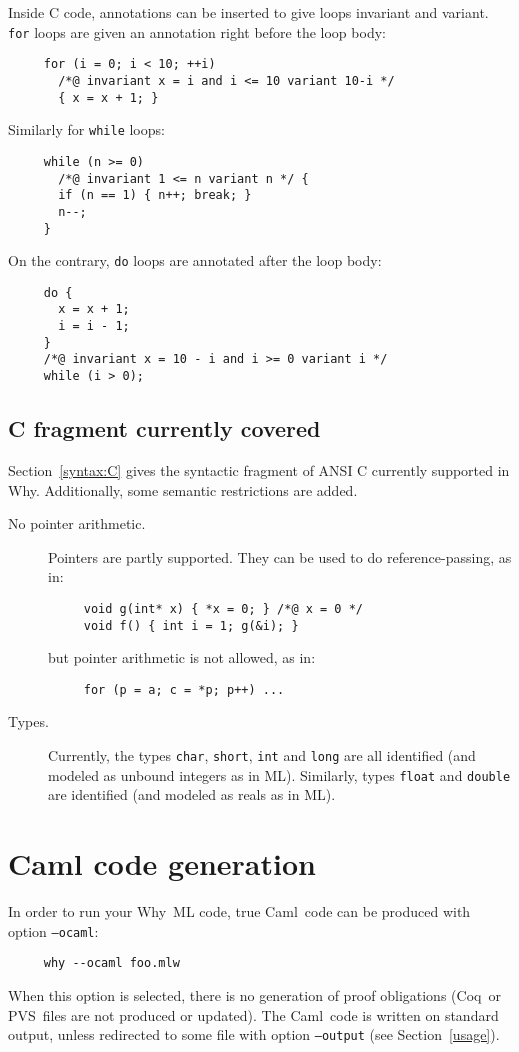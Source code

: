 \documentclass[a4paper,12pt]{report}
\makeatletter
\newcommand{\caml}{\textsf{Caml}}
\newcommand{\pvs}{\textsf{PVS}\index{PVS@\textsf{PVS}}}
\newcommand{\coq}{\textsf{Coq}\index{Coq@\textsf{Coq}}}
\newcommand{\why}{\textsf{Why}}
\makeatother
\begin{document}
Inside C code, annotations can be inserted to give loops invariant and
variant. \texttt{for} loops are given an annotation right before the
loop body:
\begin{verbatim}
     for (i = 0; i < 10; ++i)
       /*@ invariant x = i and i <= 10 variant 10-i */
       { x = x + 1; }
\end{verbatim}
Similarly for \texttt{while} loops:
\begin{verbatim}
     while (n >= 0) 
       /*@ invariant 1 <= n variant n */ { 
       if (n == 1) { n++; break; }
       n--;
     }
\end{verbatim}
On the contrary, \texttt{do} loops are annotated after the loop body:
\begin{verbatim}
     do {
       x = x + 1;
       i = i - 1;
     }
     /*@ invariant x = 10 - i and i >= 0 variant i */
     while (i > 0);
\end{verbatim}


\subsection{C fragment currently covered}

Section~\ref{syntax:C} gives the syntactic fragment of ANSI C
currently supported in \why. Additionally, some semantic restrictions
are added.
\begin{description}
\item[No pointer arithmetic.] Pointers are partly supported. They can
  be used to do reference-passing, as in:
\begin{verbatim}
     void g(int* x) { *x = 0; } /*@ x = 0 */
     void f() { int i = 1; g(&i); }
\end{verbatim}
  but pointer arithmetic is not allowed, as in:
\begin{verbatim}
     for (p = a; c = *p; p++) ...
\end{verbatim}

\item[Types.] Currently, the types \texttt{char},
  \texttt{short}, \texttt{int} and \texttt{long} are all identified
  (and modeled as unbound integers as in ML). Similarly, types
  \texttt{float} and \texttt{double} are identified (and modeled as
  reals as in ML).

\end{description}


\section{Caml code generation}
\label{ocamlcode}
In order to run your \why\ ML code, true \caml\ code can be
produced with option \texttt{--ocaml}: 
\begin{verbatim}
     why --ocaml foo.mlw
\end{verbatim}
When this option is selected, there is no generation of proof
obligations (\coq\ or \pvs\ files are not produced or updated).
The \caml\ code is written on standard output, unless redirected to
some file with option \texttt{--output} (see Section~\ref{usage}).
\end{document}
